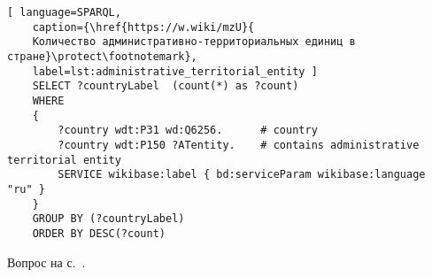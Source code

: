 
\begin{task}
	\label{answer:administrative_territorial}
	
	\begin{lstlisting}[ language=SPARQL, 
	caption={\href{https://w.wiki/mzU}{
	Количество административно-территориальных единиц в стране}\protect\footnotemark},
	label=lst:administrative_territorial_entity	]
	SELECT ?countryLabel  (count(*) as ?count)
	WHERE
	{
		?country wdt:P31 wd:Q6256.      # country
		?country wdt:P150 ?ATentity.    # contains administrative territorial entity
		SERVICE wikibase:label { bd:serviceParam wikibase:language "ru" }
	}
	GROUP BY (?countryLabel)
	ORDER BY DESC(?count)
	\end{lstlisting}
	
	\small{Вопрос на с.~\pageref{lst:age_of_country}.}
\end{task}

